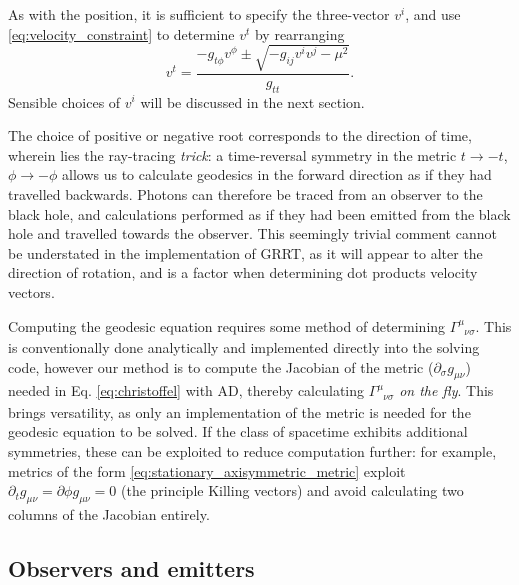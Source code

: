 \documentclass[fleqn,usenatbib]{mnras}
\newcommand{\utensor}[3]{#1^{#2}_{\phantom{#2}#3}}
\newcommand{\vel}[1]{v^{#1}}
\begin{document}
As with the position, it is sufficient to specify the three-vector $\vel{i}$,
and use \ref{eq:velocity_constraint} to determine $\vel{t}$ by rearranging
\begin{equation}
\vel{t}  = \frac{-g_{t\phi} \vel{\phi} \pm
    \sqrt{-g_{ij} \vel{i} \vel{j} - \mu^2}
}{g_{tt}}.
\end{equation}
Sensible choices of $v^i$ will be discussed in the next section.

The choice of positive or negative root corresponds to the direction of time,
wherein lies the ray-tracing \textit{trick}: a time-reversal symmetry in the
metric $t \rightarrow -t$, $\phi \rightarrow -\phi$ allows us to calculate
geodesics in the forward direction as if they had travelled backwards. Photons
can therefore be traced from an observer to the black hole, and calculations
performed as if they had been emitted from the black hole and travelled towards
the observer. This seemingly trivial comment cannot be understated in the
implementation of GRRT, as it will appear to alter the direction of rotation,
and is a factor when determining dot products velocity vectors.

Computing the geodesic equation requires some method of determining
$\utensor{\Gamma}{\mu}{\nu\sigma}$. This is conventionally done analytically
and implemented directly into the solving code, however our method is to
compute the Jacobian of the metric ($\partial_{\sigma} g_{\mu \nu}$) needed in
Eq. \eqref{eq:christoffel} with AD, thereby calculating
$\utensor{\Gamma}{\mu}{\nu\sigma}$ \textit{on the fly}.  This brings
versatility, as only an implementation of the metric is needed for the geodesic
equation to be solved.  If the class of spacetime exhibits additional
symmetries, these can be exploited to reduce computation further: for example,
metrics of the form \eqref{eq:stationary_axisymmetric_metric} exploit $\partial_t
g_{\mu\nu} = \partial{\phi} g_{\mu\nu} = 0$ (the principle Killing vectors) and
avoid calculating two columns of the Jacobian entirely.

\subsection{Observers and emitters}
\label{sec:observers-and-emitters}
\end{document}
